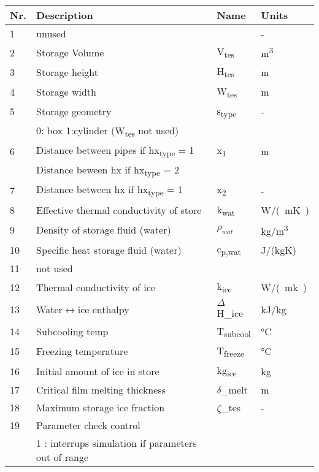 \documentclass[english]{SPFReport}
\begin{document}
\def\arraystretch{1.3}
\begin{tabular}{| l |  m{8cm} | l | l |}


\hline
\textbf{Nr.} & \textbf{Description} & \textbf{Name}& \textbf{Units} \\
\hline

 1 & unused &  & -  \\
  2 & Storage Volume & \si{V_{tes}} & \si{m^3}  \\
  3 & Storage height & \si{H_{tes}} & m  \\
  4 & Storage width & \si{W_{tes}} & m  \\
  5 & Storage geometry & \si{s_{type}} & - \\    
     &   0: box 1:cylinder (\si{W_{tes}} not used) &&\\
  6 & Distance between pipes if \si{hx_{type}} = 1 & \si{x_1} & m \\
     & Distance beween hx if \si{hx_{type}} = 2 & & \\
  7 & Distance between hx if \si{hx_{type}} = 1 & \si{x_2} & -  \\
  8 & Effective thermal conductivity of store & \si{k_{wat}} & \si{W/(mK)}  \\
  9 & Density of storage fluid (water) & \si{$\rho_{wat}$} & \si{kg/m^3}  \\
  10 & Specific heat storage fluid (water) & \si{c_{p,wat}} & J/(kgK) \\
11 &not used &  &  \\
  12 & Thermal conductivity of ice & \si{k_{ice}} & \si{W/(mk)}  \\
  13 & Water$\leftrightarrow$ice enthalpy & \si{$\Delta$H_{ice}} &        \si{kJ/kg}  \\
  14 & Subcooling temp & \si{T_{subcool}} & \si{\degreeCelsius} \\
  15 & Freezing temperature & \si{T_{freeze}} &\si{\degreeCelsius} \\
  16 & Initial amount of ice in store & \si{kg_{ice}} & kg \\
  17 & Critical film melting thickness & \si{$\delta$_{melt}} & m \\
  18 & Maximum storage ice fraction & \si{$\zeta$_{tes}} & - \\
  19 & Parameter check control &&\\
       &  1 : interrups simulation if parameters out of range && \\

\end{tabular}
\end{document}
